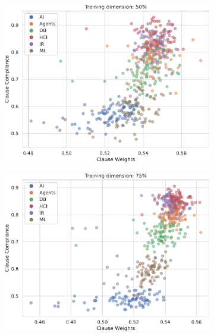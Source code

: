 \begin{figure}
\begin{subfigure}{.5\textwidth}
	\includegraphics[width=0.95\linewidth]{figures/scatter_50.pdf}
	\label{fig:cc}
\end{subfigure}%
\begin{subfigure}{.5\textwidth}
	\centering
	\includegraphics[width=0.95\linewidth]{figures/scatter_75.pdf}
	\label{fig:dd}	
\end{subfigure}\\
\begin{subfigure}{0.5\textwidth}
	\centering

\end{subfigure}
\end{figure}

